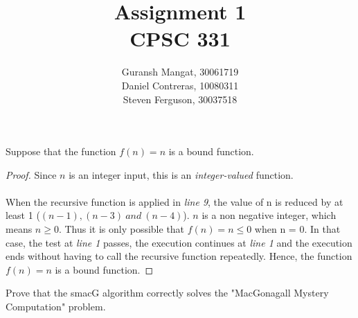 \documentclass[12pt]{article}
\newenvironment{problem}[2][Problem]{\begin{trivlist}
\item[\hskip \labelsep {\bfseries #1}\hskip \labelsep {\bfseries #2.}]}{\end{trivlist}}
\begin{document}
 

\title{Assignment 1 \\ CPSC 331} %
\author{Guransh Mangat, 30061719 \\ Daniel Contreras, 10080311 \\ Steven Ferguson, 30037518\\}
\date{}


 
\maketitle{}

\newpage


\begin{problem}{1}
    Suppose that the function $f(n)=n$ is a bound function.
\end{problem}

\begin{proof}
    Since $n$ is an integer input, this is an \textit{integer-valued} function.\\ \\ When the 
    recursive function is applied in \textit{line 9}, the value of n is reduced by at least 1 
    ($(n-1), (n-3) \ and \ (n-4)$). \newline \newline $n$ is a non negative integer, which means 
    $n \geq 0$. Thus it is only possible that $ f(n) = n \leq 0$ when n = 0. In that case, the test 
    at \textit{line 1} passes, the execution continues at \textit{line 1} and the execution ends 
    without having to call the recursive function repeatedly. \newline \newline Hence, the function 
    $f(n) = n$ is a bound function. 
\end{proof}


\begin{problem}{2}
    Prove that the smacG algorithm correctly solves the "MacGonagall Mystery Computation" problem.
\end{problem}
\end{document}
